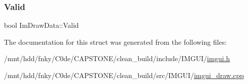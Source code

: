 \mbox{\label{structImDrawData_ad01ab9ce5e8843b7860ccbb3eb9a6554}} 
\subsubsection{\texorpdfstring{Valid}{Valid}}
{\footnotesize\ttfamily bool Im\+Draw\+Data\+::\+Valid}



The documentation for this struct was generated from the following files\+:\begin{DoxyCompactItemize}
\item 
/mnt/hdd/fnky/\+C0de/\+C\+A\+P\+S\+T\+O\+N\+E/clean\+\_\+build/include/\+I\+M\+G\+U\+I/\hyperlink{imgui_8h}{imgui.\+h}\item 
/mnt/hdd/fnky/\+C0de/\+C\+A\+P\+S\+T\+O\+N\+E/clean\+\_\+build/src/\+I\+M\+G\+U\+I/\hyperlink{imgui__draw_8cpp}{imgui\+\_\+draw.\+cpp}\end{DoxyCompactItemize}
